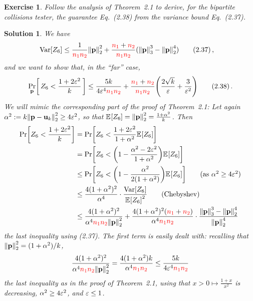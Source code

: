 \documentclass[biber]{nowfnt} %
\newtheorem{question}{Exercise}[chapter]
\newtheorem{solution}{Solution}[chapter]
\newcommand{\nss}{\textcolor{red}{\ns_1}}
\newcommand{\nst}{\textcolor{red}{\ns_2}}
\newcommand{\nss}{\ns_1}
\newcommand{\nst}{\ns_2}
\begin{document}
\begin{question}\label{ex:uniformity:bipartite}
  Follow the analysis of Theorem~2.1 to derive, for the bipartite collisions tester, the guarantee Eq.~(2.38) from the variance bound Eq.~(2.37).
\end{question}
\begin{solution}
We have
\begin{align}
  \Var[Z_6] 
  &\leq \frac{1}{\nss\nst}\normtwo{\p}^2 + \frac{\nss+\nst}{\nss\nst}(\norm{\p}_3^3-\normtwo{\p}^4) \tag{2.37}\,,
\end{align}
and we want to show that, in the ``far'' case,
\begin{align}
  \probaDistrOf{\p}{ Z_6 < \frac{1+2\dst^2}{\ab} }
  \leq \frac{5\ab}{4\dst^4\nss\nst} + \frac{\nss+\nst}{\nss\nst}\Paren{\frac{2\sqrt{\ab}}{\dst}+\frac{3}{\dst^2}} \tag{2.38}\,.
\end{align}
We will mimic the corresponding part of the proof of Theorem~2.1:
Let again $\alpha^2 \eqdef \ab\normtwo{\p-\uniform_\ab}^2 \geq 4\dst^2$, so that $\bEE{Z_6} = \normtwo{\p}^2 = \frac{1+\alpha^2}{\ab}$. Then
    \begin{align*}
      \bPr{Z_6 < \frac{1+2\dst^2}{\ab}} 
      &= \bPr{Z_6 < \frac{1+2\dst^2}{1+\alpha^2}\bEE{Z_6}} \\
      &= \bPr{Z_6 < \Paren{1-\frac{\alpha^2-2\dst^2}{1+\alpha^2}}\bEE{Z_6}} \\
      &\leq \bPr{Z_6 < \Paren{1-\frac{\alpha^2}{2(1+\alpha^2)}}\bEE{Z_6}} \tag{as $\alpha^2 \geq 4\dst^2$}\\
      &\leq \frac{4(1+\alpha^2)^2}{\alpha^4}\cdot \frac{\Var[Z_6]}{\bEE{Z_6}^2} \tag{Chebyshev}\\
      &\leq \frac{4(1+\alpha^2)^2}{\alpha^4\nss\nst\normtwo{\p}^2} + \frac{4(1+\alpha^2)^2(\nss+\nst)}{\alpha^4\nss\nst}\cdot \frac{\norm{\p}_3^3-\normtwo{\p}^4}{\normtwo{\p}^4} 
    \end{align*}
    the last inequality using (2.37). The first term is easily dealt with: recalling that $\normtwo{\p}^2 = (1+\alpha^2)/\ab$,
    \[
        \frac{4(1+\alpha^2)^2}{\alpha^4\nss\nst\normtwo{\p}^2} = \frac{4(1+\alpha^2)\ab}{\alpha^4\nss\nst} \leq \frac{5\ab}{4\dst^4\nss\nst}
    \]
    the last inequality as in the proof of Theorem~2.1, using that $x>0 \mapsto \frac{1+x}{x^2}$ is decreasing, $\alpha^2\geq 4\varepsilon^2$, and $\varepsilon \leq 1$.
    

\end{solution}
\end{document}
